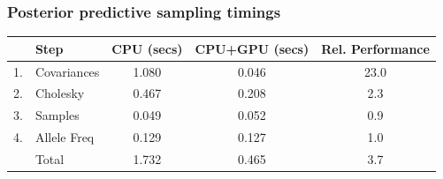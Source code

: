 \documentclass[t]{beamer}\usepackage[]{graphicx}\usepackage[]{color}
\begin{document}

\begin{frame}
\frametitle{Posterior predictive sampling timings}




\vspace{-7mm}

\begin{center}
\renewcommand*{\arraystretch}{1.5}
\begin{tabular}{rl|c|c|c}
& Step                                    & CPU (secs)  & CPU+GPU (secs)  & Rel. Performance \\
\hline
1. & Covariances                          & 1.080       & 0.046           & 23.0 \\
2. & Cholesky                             & 0.467       & 0.208           & 2.3 \\
3. & Samples                              & 0.049       & 0.052           & 0.9 \\
4. & Allele Freq                          & 0.129       & 0.127           & 1.0 \\
\hline 
   & Total                                & 1.732       & 0.465           & 3.7 \\
\end{tabular}

\end{center}

\vspace{3mm}
\end{frame}
\end{document}
